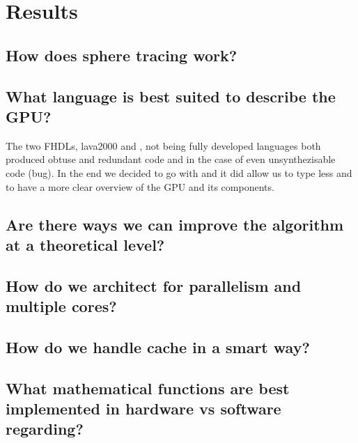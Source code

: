 \chapter{Results}

	\section{How does sphere tracing work?}

	\section{What language is best suited to describe the GPU?}
	
	The two FHDLs, lava2000 and \clash, not being fully developed languages both produced obtuse and redundant code and in the case of \clash even unsynthezisable code (bug). In the end we decided to go with \clash and it did allow us to type less and to have a more clear overview of the GPU and its components.

	\section{Are there ways we can improve the algorithm at a theoretical level?}



	\section{How do we architect for parallelism and multiple cores?}

	\section{How do we handle cache in a smart way?}

	\section{What mathematical functions are best implemented in hardware vs software regarding?}
